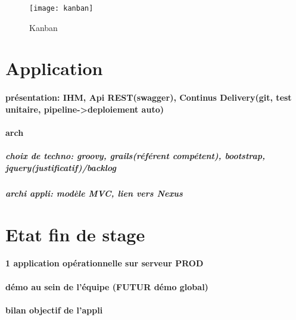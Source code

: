 \begin{figure}[h]
\centering
\texttt{[image: kanban]}
\caption{Kanban}
\end{figure}

\clearpage

\section{Application}
\paragraph{présentation: IHM, Api REST(swagger), Continus Delivery(git, test unitaire, pipeline->deploiement auto)}
\paragraph{arch}
\subparagraph{choix de techno: groovy, grails(référent compétent), bootstrap, jquery(justificatif)/backlog}
\subparagraph{archi appli: modèle MVC, lien vers Nexus}

\clearpage

\section{Etat fin de stage}
\paragraph{1 application opérationnelle sur serveur PROD}
\paragraph{démo au sein de l’équipe (FUTUR démo global)}
\paragraph{bilan objectif de l’appli}

\clearpage
